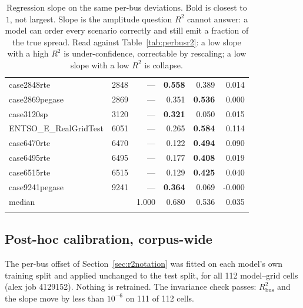 \documentclass[10pt]{article}
\begin{document}
\begin{longtable}{lrrrrr}
case2848rte & 2848 & --- & \textbf{0.558} & 0.389 & 0.014 \\
case2869pegase & 2869 & --- & 0.351 & \textbf{0.536} & 0.000 \\
case3120sp & 3120 & --- & \textbf{0.321} & 0.050 & 0.015 \\
ENTSO\_E\_RealGridTest & 6051 & --- & 0.265 & \textbf{0.584} & 0.114 \\
case6470rte & 6470 & --- & 0.122 & \textbf{0.494} & 0.090 \\
case6495rte & 6495 & --- & 0.177 & \textbf{0.408} & 0.019 \\
case6515rte & 6515 & --- & 0.129 & \textbf{0.425} & 0.040 \\
case9241pegase & 9241 & --- & \textbf{0.364} & 0.069 & -0.000 \\
\midrule
median & & 1.000 & 0.680 & 0.536 & 0.035 \\
\bottomrule
\caption{Regression slope on the same per-bus deviations.  Bold is closest to
$1$, not largest.  Slope is the amplitude question $R^2$ cannot answer: a model
can order every scenario correctly and still emit a fraction of the true
spread.  Read against Table~\ref{tab:perbusr2}: a low slope with a high $R^2$
is under-confidence, correctable by rescaling; a low slope with a low $R^2$ is
collapse.}
\end{longtable}

\subsection*{Post-hoc calibration, corpus-wide}
\label{sec:calcorpus}

The per-bus offset of Section~\ref{sec:r2notation} was fitted on each model's
own training split and applied unchanged to the test split, for all 112
model--grid cells (alex job 4129152).  Nothing is retrained.  The invariance
check passes: $R^2_{\mathrm{bus}}$ and the slope move by less than $10^{-6}$ on
111 of 112 cells.
\end{document}
